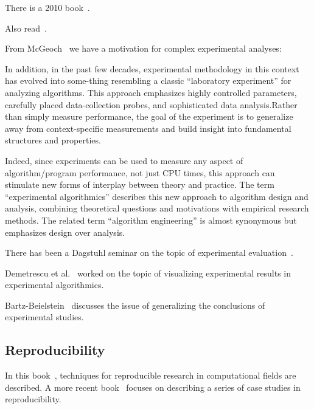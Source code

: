 \documentclass{llncs}
\begin{document}
There is a 2010 book~\cite{DBLP:books/sp/2010BCPP}.

Also read~\cite{DBLP:series/ncs/Bartz-BeielsteinP14}.

From McGeoch~\cite{DBLP:journals/cacm/McGeoch07} we have a motivation for complex
experimental analyses:
\begin{center}
\begin{minipage}{0.8\textwidth}
  In addition, in the past few decades, experimental methodology in this
  context has evolved into some-thing resembling a classic “laboratory
  experiment” for analyzing algorithms. This approach emphasizes highly
  controlled parameters, carefully placed data-collection probes, and
  sophisticated data analysis.Rather than simply measure performance, the
  goal of the experiment is to generalize away from context-specific
  measurements and build insight into fundamental structures and properties.

  Indeed, since experiments can be used to measure any aspect of
  algorithm/program performance, not just CPU times, this approach can
  stimulate new forms of interplay between theory and practice. The term
  “experimental algorithmics” describes this new approach to algorithm design
  and analysis, combining theoretical questions and motivations with
  empirical research methods. The related term “algorithm engineering” is
  almost synonymous but emphasizes design over analysis.
\end{minipage}
\end{center}

There has been a Dagstuhl seminar on the topic of 
experimental evaluation~\cite{DBLP:conf/dagstuhl/2000ea}.

Demetrescu et al.~\cite{DBLP:conf/dagstuhl/DemetrescuFIN00} worked on
the topic of visualizing experimental results in experimental algorithmics.

Bartz-Beielstein~\cite{DBLP:reference/sp/Bartz-Beielstein15} discusses
the issue of generalizing the conclusions of experimental studies.

\subsection{Reproducibility}

In this book~\cite{stodden2014implementing}, techniques for reproducible
research in computational fields are described.
A more recent book~\cite{kitzes2017practice} focuses on describing a series
of case studies in reproducibility.
\end{document}
